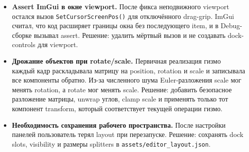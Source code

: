 \documentclass[a4paper,14pt]{extarticle}
\DeclareRobustCommand{\code}[1]{\nolinkurl{#1}}
\begin{document}
\begin{itemize}
  \item \textbf{Assert ImGui в окне viewport.} После фикса неподвижного viewport остался вызов \texttt{SetCursorScreenPos()} для отключённого drag-grip. ImGui считал, что код расширяет границы окна без последующего item, и в Debug-сборке вызывал assert. Решение: удалить мёртвый вызов и не создавать dock-controls для viewport.

  \item \textbf{Дрожание объектов при rotate/scale.} Первичная реализация гизмо каждый кадр раскладывала матрицу на position, rotation и scale и записывала все компоненты обратно. Из-за численного шума Euler-разложения scale мог менять rotation, а rotate мог менять scale. Решение: добавить безопасное разложение матрицы, unwrap углов, clamp scale и применять только тот компонент transform, который соответствует текущей операции гизмо.

  \item \textbf{Необходимость сохранения рабочего пространства.} После настройки панелей пользователь терял layout при перезапуске. Решение: сохранять dock slots, visibility и размеры splitters в \code{assets/editor_layout.json}.
\end{itemize}
\end{document}
